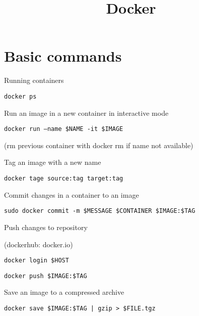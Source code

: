 


\title{Docker}


\date{}


\maketitle

\justify

\renewcommand{\abstractname}{}

\begin{abstract}

\end{abstract}



\section*{Basic commands}

Running containers 

\texttt{docker ps}


\bigskip


Run an image in a new container in interactive mode

\texttt{docker run --name \$NAME -it \$IMAGE}

(rm previous container with docker rm if name not available)

\bigskip


Tag an image with a new name

\texttt{docker tage source:tag target:tag}

\bigskip

Commit changes in a container to an image

\texttt{sudo docker commit -m \$MESSAGE \$CONTAINER \$IMAGE:\$TAG}

\bigskip

Push changes to repository

(dockerhub: docker.io)

\texttt{docker login \$HOST}

\texttt{docker push \$IMAGE:\$TAG}



\bigskip


Save an image to a compressed archive

\texttt{docker save \$IMAGE:\$TAG | gzip > \$FILE.tgz }




%
%



